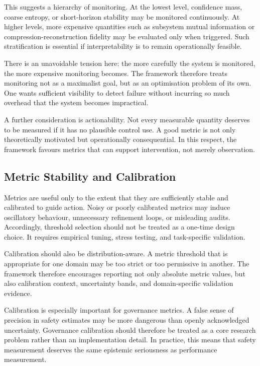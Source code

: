 \documentclass[12pt]{article}
\begin{document}
This suggests a hierarchy of monitoring. At the lowest level, confidence mass, coarse entropy, or short-horizon stability may be monitored continuously. At higher levels, more expensive quantities such as subsystem mutual information or compression-reconstruction fidelity may be evaluated only when triggered. Such stratification is essential if interpretability is to remain operationally feasible.

There is an unavoidable tension here: the more carefully the system is monitored, the more expensive monitoring becomes. The framework therefore treats monitoring not as a maximalist goal, but as an optimisation problem of its own. One wants sufficient visibility to detect failure without incurring so much overhead that the system becomes impractical.

A further consideration is actionability. Not every measurable quantity deserves to be measured if it has no plausible control use. A good metric is not only theoretically motivated but operationally consequential. In this respect, the framework favours metrics that can support intervention, not merely observation.

\subsection{Metric Stability and Calibration}
Metrics are useful only to the extent that they are sufficiently stable and calibrated to guide action. Noisy or poorly calibrated metrics may induce oscillatory behaviour, unnecessary refinement loops, or misleading audits. Accordingly, threshold selection should not be treated as a one-time design choice. It requires empirical tuning, stress testing, and task-specific validation.

Calibration should also be distribution-aware. A metric threshold that is appropriate for one domain may be too strict or too permissive in another. The framework therefore encourages reporting not only absolute metric values, but also calibration context, uncertainty bands, and domain-specific validation evidence.

Calibration is especially important for governance metrics. A false sense of precision in safety estimates may be more dangerous than openly acknowledged uncertainty. Governance calibration should therefore be treated as a core research problem rather than an implementation detail. In practice, this means that safety measurement deserves the same epistemic seriousness as performance measurement.
\end{document}
